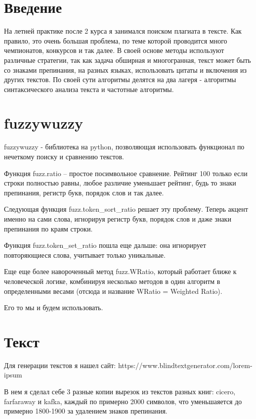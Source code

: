 \section{Введение}

На летней практике после 2 курса я занимался поиском плагиата в тексте. Как правило, это очень большая проблема, по теме которой проводится много чемпионатов, конкурсов и так далее. В своей основе методы используют различные стратегии, так как задача обширная и многогранная, текст может быть со знаками препинания, на разных языках, использовать цитаты и включения из других текстов. По своей сути алгоритмы делятся на два лагеря - алгоритмы синтаксического анализа текста и частотные алгоритмы.

\section{fuzzywuzzy}

fuzzywuzzy - библиотека на python, позволяющая использовать функционал по нечеткому поиску и сравнению текстов.

Функция fuzz.ratio – простое посимвольное сравнение. Рейтинг 100 только если строки полностью равны, любое различие уменьшает рейтинг, будь то знаки препинания, регистр букв, порядок слов и так далее.

Следующая функция fuzz.token\_sort\_ratio решает эту проблему. Теперь акцент именно на сами слова, игнорируя регистр букв, порядок слов и даже знаки препинания по краям строки.

Функция fuzz.token\_set\_ratio пошла еще дальше: она игнорирует повторяющиеся слова, учитывает только уникальные.

Еще еще более навороченный метод fuzz.WRatio, который работает ближе к человеческой логике, комбинируя несколько методов в один алгоритм в определенными весами (отсюда и название WRatio = Weighted Ratio).

Его то мы и будем использовать.

\section{Текст}

Для генерации текстов я нашел сайт:
https://www.blindtextgenerator.com/lorem-ipsum

В нем я сделал себе 3 разные копии вырезок из текстов разных книг: cicero, farfaraway и kafka, каждый по примерно 2000 символов, что уменьшаяется до примерно 1800-1900 за удалением знаков препинания.

